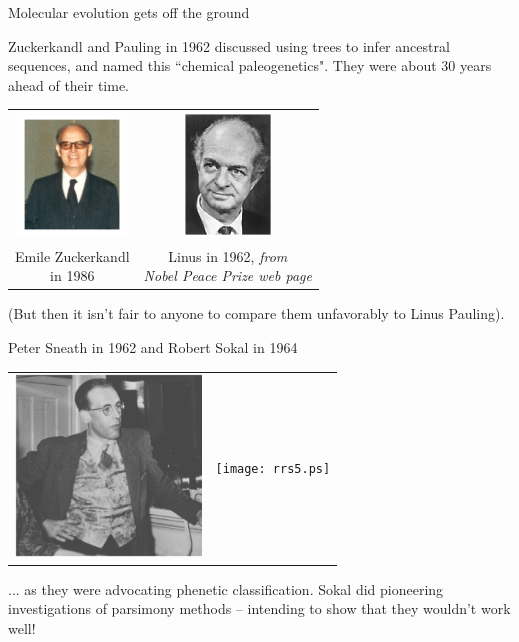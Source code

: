\documentclass[bluish,slideColor,colorBG,pdf]{prosper}
\begin{document}
\begin{slide}[Replace]{Molecular evolution gets off the ground}

Zuckerkandl and Pauling in 1962 discussed using trees to infer ancestral
sequences, and named this ``chemical paleogenetics".  They were about
30 years ahead of their time.

\begin{center}
\begin{tabular}{c c}
{\includegraphics[height=1.3in]{Zuckerkandl1986.ps}} &
{\includegraphics[height=1.3in]{pauling.ps}} \\
\parbox[t]{1.5in}{Emile Zuckerkandl\\in 1986} &
\parbox[t]{2.0in}{Linus in 1962, {\it from\\ Nobel Peace Prize web page}} \\
\end{tabular}
\end{center}
\medskip

(But then it isn't fair to anyone to compare them unfavorably to Linus
Pauling).

\end{slide}

\begin{slide}[Replace]{Peter Sneath in 1962 and Robert Sokal in 1964}

\begin{center}
\begin{tabular}{r l}
\includegraphics[height=1.9in]{sneath.ps} &
\texttt{[image: rrs5.ps]}
\end{tabular}
\end{center}
\bigskip

... as they were advocating phenetic classification.  Sokal did pioneering
investigations of
parsimony methods -- intending to show that they wouldn't work well!

\end{slide}
\end{document}
